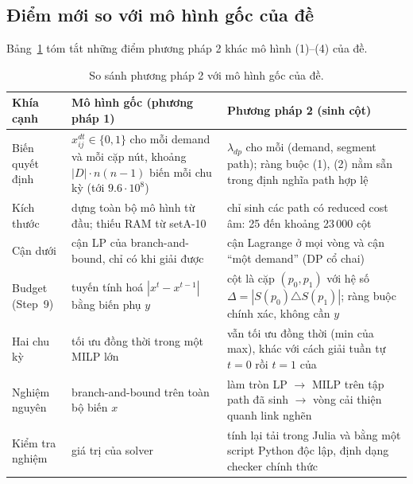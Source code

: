 \documentclass[11pt,a4paper]{article}
\begin{document}
\subsection{Điểm mới so với mô hình gốc của đề}\label{sec:new}

Bảng~\ref{tab:new} tóm tắt những điểm phương pháp 2 khác mô hình (1)--(4) của đề.

\begin{table}[h]
\centering\small
\begin{tabular}{@{}>{\raggedright\arraybackslash}p{2.9cm}>{\raggedright\arraybackslash}p{5.6cm}>{\raggedright\arraybackslash}p{6.6cm}@{}}
\toprule
Khía cạnh & Mô hình gốc (phương pháp 1) & Phương pháp 2 (sinh cột) \\
\midrule
Biến quyết định & $x^{dt}_{ij}\in\{0,1\}$ cho mỗi demand và mỗi cặp nút, khoảng $|D|\cdot n(n-1)$ biến mỗi chu kỳ (tới $9.6\cdot10^8$) & $\lambda_{dp}$ cho mỗi (demand, segment path); ràng buộc (1), (2) nằm sẵn trong định nghĩa path hợp lệ \\
Kích thước & dựng toàn bộ mô hình từ đầu; thiếu RAM từ setA-10 & chỉ sinh các path có reduced cost âm: 25 đến khoảng 23\,000 cột \\
Cận dưới & cận LP của branch-and-bound, chỉ có khi giải được & cận Lagrange ở mọi vòng và cận ``một demand'' (DP cổ chai) \\
Budget (Step~9) & tuyến tính hoá $|x^{t}-x^{t-1}|$ bằng biến phụ $y$ & cột là cặp $(p_0,p_1)$ với hệ số $\Delta=|S(p_0)\triangle S(p_1)|$; ràng buộc chính xác, không cần $y$ \\
Hai chu kỳ & tối ưu đồng thời trong một MILP lớn & vẫn tối ưu đồng thời (min của max), khác với cách giải tuần tự $t=0$ rồi $t=1$ của \cite{jaumard2026} \\
Nghiệm nguyên & branch-and-bound trên toàn bộ biến $x$ & làm tròn LP $\to$ MILP trên tập path đã sinh $\to$ vòng cải thiện quanh link nghẽn \\
Kiểm tra nghiệm & giá trị của solver & tính lại tải trong Julia và bằng một script Python độc lập, định dạng checker chính thức \\
\bottomrule
\end{tabular}
\caption{So sánh phương pháp 2 với mô hình gốc của đề.}\label{tab:new}
\end{table}
\end{document}
